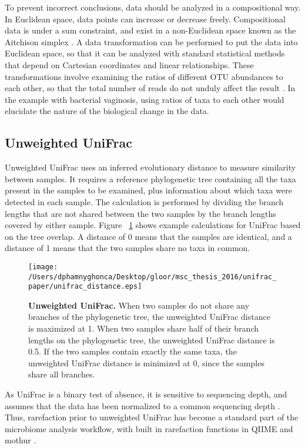 \documentclass[10pt,letterpaper]{article}
\begin{document}
To prevent incorrect conclusions, data should be analyzed in a compositional way. In Euclidean space, data points can increase or decrease freely. Compositional data is under a sum constraint, and exist in a non-Euclidean space known as the Aitchison simplex \cite{aitchison1982statistical}. A data transformation can be performed to put the data into Euclidean space, so that it can be analyzed with standard statistical methods that depend on Cartesian coordinates and linear relationships. These transformations involve examining the ratios of different OTU abundances to each other, so that the total number of reads do not unduly affect the result \cite{gloor2016s} \cite{gloor2016compositional}. In the example with bacterial vaginosis, using ratios of taxa to each other would elucidate the nature of the biological change in the data.

\subsection{Unweighted UniFrac}
Unweighted UniFrac \cite{lozupone2005unifrac} uses an inferred evolutionary distance to measure similarity between samples. It requires a reference phylogenetic tree containing all the taxa present in the samples to be examined, plus information about which taxa were detected in each sample. The calculation is performed by dividing the branch lengths that are not shared between the two samples by the branch lengths covered by either sample. Figure ~\ref{fig1} shows example calculations for UniFrac based on the tree overlap. A distance of 0 means that the samples are identical, and a distance of 1 means that the two samples share no taxa in common.

\begin{figure}[h]
\texttt{[image: /Users/dphamnyghonca/Desktop/gloor/msc\_thesis\_2016/unifrac\_paper/unifrac\_distance.eps]}
\caption[Unweighted UniFrac.]{{\bf Unweighted UniFrac.}
When two samples do not share any branches of the phylogenetic tree, the unweighted UniFrac distance is maximized at 1. When two samples share half of their branch lengths on the phylogenetic tree, the unweighted UniFrac distance is 0.5. If the two samples contain exactly the same taxa, the unweighted UniFrac distance is minimized at 0, since the samples share all branches.}
\label{fig1}
\end{figure}

As UniFrac is a binary test of absence, it is sensitive to sequencing depth, and assumes that the data has been normalized to a common sequencing depth \cite{lozupone2011unifrac}. Thus, rarefaction prior to unweighted UniFrac has become a standard part of the microbiome analysis workflow, with built in rarefaction functions in QIIME \cite{caporaso2010qiime} and mothur \cite{schloss2009introducing}.
\end{document}
